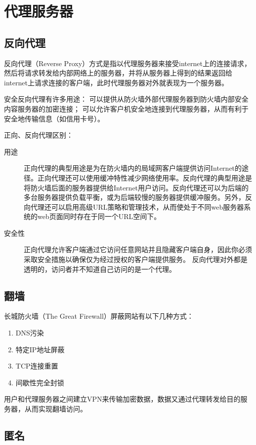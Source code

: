 \section{代理服务器}

\subsection{反向代理}
反向代理（Reverse Proxy）方式是指以代理服务器来接受internet上的连接请求，然后将请求转发给内部网络上的服务器，并将从服务器上得到的结果返回给internet上请求连接的客户端，此时代理服务器对外就表现为一个服务器。

安全反向代理有许多用途：
可以提供从防火墙外部代理服务器到防火墙内部安全内容服务器的加密连接；
可以允许客户机安全地连接到代理服务器，从而有利于安全地传输信息（如信用卡号）。


正向、反向代理区别：
\begin{description}
\item[用途]正向代理的典型用途是为在防火墙内的局域网客户端提供访问Internet的途径。正向代理还可以使用缓冲特性减少网络使用率。反向代理的典型用途是将防火墙后面的服务器提供给Internet用户访问。反向代理还可以为后端的多台服务器提供负载平衡，或为后端较慢的服务器提供缓冲服务。另外，反向代理还可以启用高级URL策略和管理技术，从而使处于不同web服务器系统的web页面同时存在于同一个URL空间下。
\item[安全性]正向代理允许客户端通过它访问任意网站并且隐藏客户端自身，因此你必须采取安全措施以确保仅为经过授权的客户端提供服务。
反向代理对外都是透明的，访问者并不知道自己访问的是一个代理。
\end{description}

\subsection{翻墙}
长城防火墙（The Great Firewall）屏蔽网站有以下几种方式：
\begin{enumerate}
\item DNS污染
\item 特定IP地址屏蔽
\item TCP连接重置 
\item 间歇性完全封锁
\end{enumerate}

用户和代理服务器之间建立VPN来传输加密数据，数据又通过代理转发给目的服务器，从而实现翻墙访问。


\subsection{匿名}


